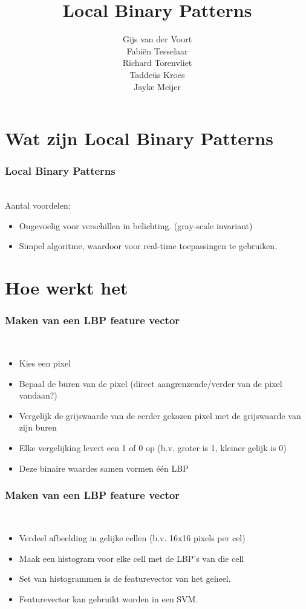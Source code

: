 \documentclass{beamer}
\author{Gijs van der Voort \\ Fabi\"en Tesselaar \\ Richard Torenvliet \\ Tadde\"us Kroes \\ Jayke Meijer}
\title{Local Binary Patterns}
\begin{document}
	
  \section{Wat zijn Local Binary Patterns}
		
  \begin{frame}
    \titlepage
  \end{frame}

  \begin{frame}
    \frametitle{Local Binary Patterns}
    \\
    \pause
    Aantal voordelen:
    \begin{itemize}
      \item Ongevoelig voor verschillen in belichting. (gray-scale invariant)
      \pause
      \item Simpel algoritme, waardoor voor real-time toepassingen te gebruiken.
    \end{itemize}
  \end{frame}
	
	\section{Hoe werkt het}
  
  \begin{frame}
    \frametitle{Maken van een LBP feature vector}
    \\
    \begin{itemize}
      \item Kies een pixel
      \pause
      \item Bepaal de buren van de pixel (direct aangrenzende/verder van de pixel vandaan?)
      \pause
      \item Vergelijk de grijswaarde van de eerder gekozen pixel met de grijswaarde van zijn buren
      \pause
      \item Elke vergelijking levert een 1 of 0 op (b.v. groter is 1, kleiner gelijk is 0)
      \pause
      \item Deze binaire waardes samen vormen \'e\'en LBP
    \end{itemize}
  \end{frame}
  
  \begin{frame}
    \frametitle{Maken van een LBP feature vector}
    \\
    \begin{itemize}
      \item Verdeel afbeelding in gelijke cellen (b.v. 16x16 pixels per cel)
      \pause
      \item Maak een histogram voor elke cell met de LBP's van die cell
      \pause
      \item Set van histogrammen is de featurevector van het geheel.
      \pause
      \item Featurevector kan gebruikt worden in een SVM.
    \end{itemize}
  \end{frame}
	
\end{document}
